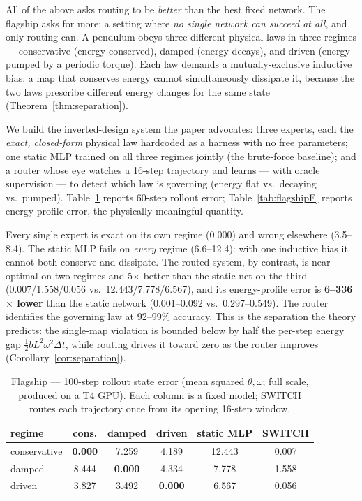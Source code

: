 \documentclass[11pt,a4paper]{article}
\begin{document}
All of the above asks routing to be \emph{better} than the best fixed network.
The flagship asks for more: a setting where \emph{no single network can
succeed at all}, and only routing can. A pendulum obeys three different
physical laws in three regimes --- conservative (energy conserved), damped
(energy decays), and driven (energy pumped by a periodic torque). Each law
demands a mutually-exclusive inductive bias: a map that conserves energy
cannot simultaneously dissipate it, because the two laws prescribe different
energy changes for the same state (Theorem~\ref{thm:separation}).

We build the inverted-design system the paper advocates: three experts, each
the \emph{exact, closed-form} physical law hardcoded as a harness with no free
parameters; one static MLP trained on all three regimes jointly (the
brute-force baseline); and a router whose eye watches a 16-step trajectory and
learns --- with oracle supervision --- to detect which law is governing (energy
flat vs.\ decaying vs.\ pumped). Table~\ref{tab:flagship} reports 60-step rollout
error; Table~\ref{tab:flagshipE} reports energy-profile error, the physically
meaningful quantity.

Every single expert is exact on its own regime (0.000) and wrong elsewhere
(3.5--8.4). The static MLP fails on \emph{every} regime (6.6--12.4): with one
inductive bias it cannot both conserve and dissipate. The routed system, by
contrast, is near-optimal on two regimes and 5$\times$ better than the static
net on the third (0.007/1.558/0.056 vs.\ 12.443/7.778/6.567), and its
energy-profile error is \textbf{6--336$\times$ lower} than the static network
(0.001--0.092 vs.\ 0.297--0.549). The router identifies the governing law at
92--99\% accuracy. This is the separation the theory predicts: the single-map
violation is bounded below by half the per-step energy gap $\tfrac12 b L^2
\omega^2 \Delta t$, while routing drives it toward zero as the router improves
(Corollary~\ref{cor:separation}).

\begin{table}[t]
  \centering
  \caption{Flagship --- 100-step rollout state error (mean squared $\theta,\omega$;
  full scale, produced on a T4 GPU). Each column is a fixed model; SWITCH routes
each trajectory once from its opening 16-step window.}
  \label{tab:flagship}
  \begin{tabular}{lccccc}
    \toprule
    regime & cons. & damped & driven & static MLP & SWITCH \\
    \midrule
    conservative & \textbf{0.000} & 7.259 & 4.189 & 12.443 & 0.007 \\
    damped       & 8.444 & \textbf{0.000} & 4.334 & 7.778 & 1.558 \\
    driven       & 3.827 & 3.492 & \textbf{0.000} & 6.567 & 0.056 \\
    \bottomrule
  \end{tabular}
\end{table}
\end{document}
